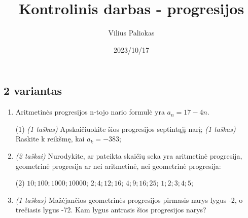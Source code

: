 \documentclass[a4paper]{article}
\title{Kontrolinis darbas - progresijos}
\author{Vilius Paliokas}
\date{2023/10/17}
\begin{document}
\thispagestyle{fancy}

\titlespacing*{\subsection}{0pt}{.75ex}{0.75ex}

\subsection*{2 variantas}

\begin{enumerate}
      \item Aritmetinės progresijos n-tojo nario formulė yra $a_{n}=17-4n$.

            \begin{tasks}[item-format={\normalfont}, after-item-skip=2mm](1)
                  \task \textit{(1 taškas)} Apskaičiuokite šios progresijos
                  septintąjį narį;
                  \task \textit{(1 taškas)} Raskite k reikšmę, kai $a_k=-383$;
            \end{tasks}

      \item \textit{(2 taškai)} Nurodykite, ar pateikta skaičių seka yra
            aritmetinė progresija, geometrinė progresija ar nei aritmetinė, nei
            geometrinė progresija:
            \begin{tasks}[item-format={\normalfont}, after-item-skip=2mm](2)
                  \task $10; 100; 1000; 10000$;
                  \task $2;4;12;16$;
                  \task $4; 9; 16; 25$;
                  \task $1;2;3;4;5$;
            \end{tasks}

      \item \textit{(1 taškas)} Mažėjančios geometrinės progresijos pirmasis
            narys lygus -2, o trečiasis lygus -72. Kam lygus antrasis šios
            progresijos narys?


\end{enumerate}
\end{document}
